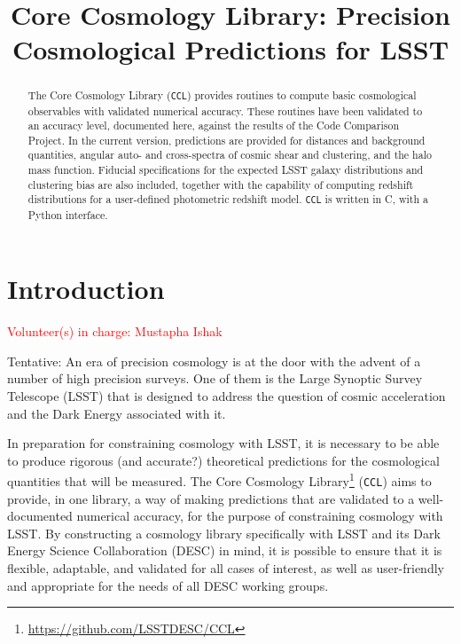\documentclass[\docopts]{\docclass}
\newcommand{\vol}[1]{\textcolor{red}{Volunteer(s) in charge: #1}}
\newcommand{\ccl}{{\tt CCL}\xspace}
\begin{document}
\title{Core Cosmology Library: Precision Cosmological Predictions for LSST}

\maketitlepre

\begin{abstract}

The Core Cosmology Library (\ccl) provides routines to compute basic cosmological observables with validated numerical accuracy. These routines have been validated to an accuracy level, documented here, against the results of the Code Comparison Project. In the current version, predictions are provided for distances and background quantities, angular auto- and cross-spectra of cosmic shear and clustering, and the halo mass function. Fiducial specifications for the expected LSST galaxy distributions and clustering bias are also included, together with the capability of computing redshift distributions for a user-defined photometric redshift model. \ccl is written in C, with a Python interface.

\end{abstract}


\maketitlepost

\newpage
\tableofcontents{}
\newpage



\section{Introduction}
\label{sec:intro}
\vol{Mustapha Ishak}

Tentative: An era of precision cosmology is at the door with the advent of a number of high precision surveys. One of them is the Large Synoptic Survey Telescope (LSST) that is designed to address the question of cosmic acceleration and the Dark Energy associated with it.  

In preparation for constraining cosmology with LSST, it is necessary to be able to produce rigorous (and accurate?) theoretical predictions for the cosmological quantities that will be measured. The Core Cosmology Library\footnote{\url{https://github.com/LSSTDESC/CCL}} (\ccl) aims to provide, in one library, a way of making predictions that are validated to a well-documented numerical accuracy, for the purpose of constraining cosmology with LSST. By constructing a cosmology library specifically with LSST and its Dark Energy Science Collaboration (DESC) in mind, it is possible to ensure that it is flexible, adaptable, and validated for all cases of interest, as well as user-friendly and appropriate for the needs of all DESC working groups.
\end{document}
